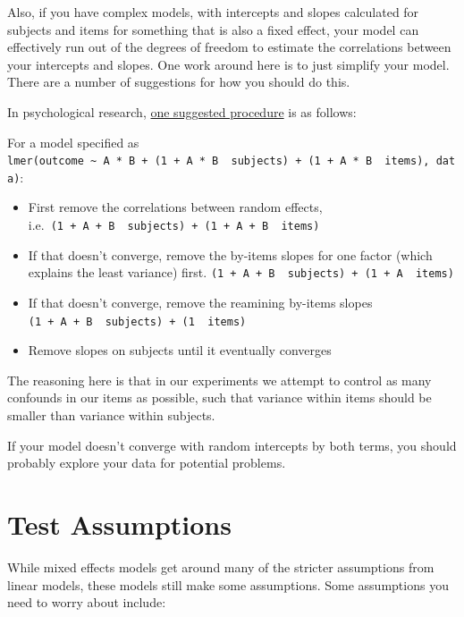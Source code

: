 \documentclass[
]{book}
\providecommand{\tightlist}{%
  \setlength{\itemsep}{0pt}\setlength{\parskip}{0pt}}
\begin{document}
Also, if you have complex models, with intercepts and slopes calculated for subjects and items for something that is also a fixed effect, your model can effectively run out of the degrees of freedom to estimate the correlations between your intercepts and slopes. One work around here is to just simplify your model. There are a number of suggestions for how you should do this.

In psychological research, \href{https://hlplab.wordpress.com/2009/05/14/random-effect-structure/}{one suggested procedure} is as follows:

For a model specified as \texttt{lmer(outcome\ \textasciitilde{}\ A\ *\ B\ +\ (1\ +\ A\ *\ B\ \textbar{}\ subjects)\ +\ (1\ +\ A\ *\ B\ \textbar{}\ items),\ data)}:

\begin{itemize}
\tightlist
\item
  First remove the correlations between random effects, i.e.~\texttt{(1\ +\ A\ +\ B\ \textbar{}\ subjects)\ +\ (1\ +\ A\ +\ B\ \textbar{}\ items)}
\item
  If that doesn't converge, remove the by-items slopes for one factor (which explains the least variance) first. \texttt{(1\ +\ A\ +\ B\ \textbar{}\ subjects)\ +\ (1\ +\ A\ \textbar{}\ items)}
\item
  If that doesn't converge, remove the reamining by-items slopes \texttt{(1\ +\ A\ +\ B\ \textbar{}\ subjects)\ +\ (1\ \textbar{}\ items)}
\item
  Remove slopes on subjects until it eventually converges
\end{itemize}

The reasoning here is that in our experiments we attempt to control as many confounds in our items as possible, such that variance within items should be smaller than variance within subjects.

If your model doesn't converge with random intercepts by both terms, you should probably explore your data for potential problems.

\hypertarget{test-assumptions}{%
\section{Test Assumptions}\label{test-assumptions}}

While mixed effects models get around many of the stricter assumptions from linear models, these models still make some assumptions. Some assumptions you need to worry about include:
\end{document}
